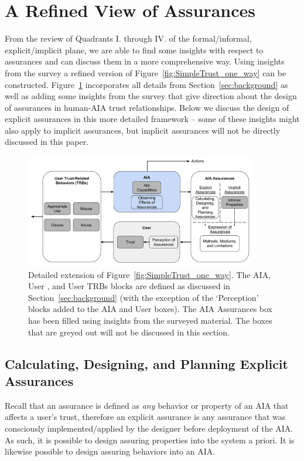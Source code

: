 \section{A Refined View of Assurances} \label{sec:synthesis}
    From the review of Quadrants I. through IV. of the formal/informal, explicit/implicit plane, we are able to find some insights with respect to assurances and can discuss them in a more comprehensive way. Using insights from the survey a refined version of Figure~\ref{fig:SimpleTrust_one_way} can be constructed. Figure~\ref{fig:refined_assurances} incorporates all details from Section~\ref{sec:background} as well as adding some insights from the survey that give direction about the design of assurances in human-AIA trust relationships. Below we discuss the design of explicit assurances in this more detailed framework -- some of these insights might also apply to implicit assurances, but implicit assurances will not be directly discussed in this paper.

    \begin{figure}[htbp]
        \centering
        \includegraphics[width=0.9\textwidth]{Figures/RefinedTrust_one_way}
        \caption{Detailed extension of Figure~\ref{fig:SimpleTrust_one_way}. The AIA, User , and User TRBs blocks are defined as discussed in Section~\ref{sec:background} (with the exception of the `Perception' blocks added to the AIA and User boxes). The AIA Assurances box has been filled using insights from the surveyed material. The boxes that are greyed out will not be discussed in this section.}
        \label{fig:refined_assurances}
    \end{figure}

\subsection{Calculating, Designing, and Planning Explicit Assurances}
    Recall that an assurance is defined as \emph{any} behavior or property of an AIA that affects a user's trust, therefore an explicit assurance is any assurance that was consciously implemented/applied by the designer before deployment of the AIA. As such, it is possible to design assuring properties into the system a priori. It is likewise possible to design assuring behaviors into an AIA.

